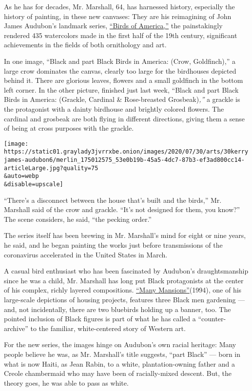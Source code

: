 As he has for decades, Mr. Marshall, 64, has harnessed history,
especially the history of painting, in these new canvases: They are his
reimagining of John James Audubon's landmark series,
\href{https://www.audubon.org/birds-of-america}{``Birds of America,''}
the painstakingly rendered 435 watercolors made in the first half of the
19th century, significant achievements in the fields of both ornithology
and art.

In one image, ``Black and part Black Birds in America: (Crow,
Goldfinch),'' a large crow dominates the canvas, clearly too large for
the birdhouses depicted behind it. There are glorious leaves, flowers
and a small goldfinch in the bottom left corner. In the other picture,
finished just last week, ``Black and part Black Birds in America:
(Grackle, Cardinal \& Rose-breasted Grosbeak)\emph{,''} a grackle is the
protagonist with a dainty birdhouse and brightly colored flowers. The
cardinal and grosbeak are both flying in different directions, giving
them a sense of being at cross purposes with the grackle.

\texttt{[image: https://static01.graylady3jvrrxbe.onion/images/2020/07/30/arts/30kerryjames-audubon6/merlin\_175012575\_53e0b19b-45a5-4dc7-87b3-ef3ad800cc14-articleLarge.jpg?quality=75\\\&auto=webp\\\&disable=upscale]}

``There's a disconnect between the house that's built and the birds,''
Mr. Marshall said of the crow and grackle. ``It's not designed for them,
you know?'' The scene considers, he said, ``the pecking order.''

The series itself has been brewing in Mr. Marshall's mind for eight or
nine years, he said, and he began painting the works just before
transmissions of the coronavirus accelerated in the United States in
March.

A casual bird enthusiast who has been fascinated by Audubon's
draughtsmanship since he was a child, Mr. Marshall has long put Black
protagonists at the center of his complex, richly layered compositions.
\href{https://www.artic.edu/artworks/137125/many-mansions}{``Many
Mansions''}(1994), one of his large-scale depictions of housing
projects, features three Black men gardening --- and, not incidentally,
there are two bluebirds holding up a banner, too. The pointed inclusion
of Black figures is part of what he has called a ``counter-archive'' to
the familiar, white-centered story of Western art.

For the new series, the images hinge on Audubon's own racial heritage:
Many people believe he was, as Mr. Marshall's title suggests, ``part
Black'' --- born in what is now Haiti, as Jean Rabin, to a white,
plantation-owning father and a Creole chambermaid who may have been of
racially-mixed descent. But, the theory goes, he was able to pass as
white.

